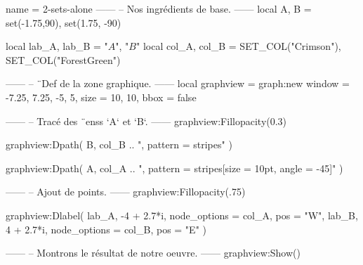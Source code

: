 \documentclass[border = 3pt]{standalone}
\begin{document}
\begin{luadraw*}{name = 2-sets-alone}
------
-- Nos ingrédients de base.
------
local A, B = set(-1.75,90), set(1.75, -90)

local lab_A, lab_B = "$A$", "$B$"
local col_A, col_B = SET_COL("Crimson"), SET_COL("ForestGreen")

------
-- ¨Def de la zone graphique.
------
local graphview = graph:new{
  window = {-7.25, 7.25, -5, 5},
  size   = {10, 10},
  bbox   = false
}

------
-- Tracé des ¨enss `A` et `B`.
------
graphview:Fillopacity(0.3)

graphview:Dpath(
  B,
  col_B .. ", pattern = stripes"
)

graphview:Dpath(
  A,
  col_A .. ", pattern = {stripes[size = 10pt, angle = -45]}"
)

------
-- Ajout de points.
------
graphview:Fillopacity(.75)

graphview:Dlabel(
  lab_A, -4 + 2.7*i, {node_options = col_A, pos = "W"},
  lab_B,  4 + 2.7*i, {node_options = col_B, pos = "E"}
)

------
-- Montrons le résultat de notre oeuvre.
------
graphview:Show()
\end{luadraw*}
\end{document}
